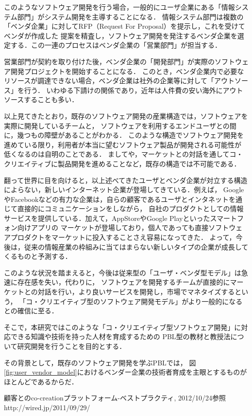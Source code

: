 \documentclass[11pt,a4paper,twoside]{jarticle}
\newcommand{\研究種別}{A}	%
\newcommand{\研究課題名}{コ・クリエイティブなソフトウェア開発のPBL型教育}
\newcommand{\研究機関名}{産業技術大学院大学}
\newcommand{\研究代表者氏名}{中鉢　欣秀}
\newcommand{\研究代表者氏名ふりがな}{ちゅうばち　よしひで}
\newcommand{\本応募effort}{\KLEffort{18}}	%
\newcommand{\研究期間の最終元号年度}{27}	%
\begin{document}
{    このようなソフトウェア開発を行う場合，一般的にユーザ企業にある「情報システム部門」がシステム開発を主導することになる．
    情報システム部門は複数の「ベンダ企業」に対してRFP（Request For Proposal）を提示し，これを受けてベンダが作成した
    提案を精査し，ソフトウェア開発を発注するベンダ企業を選定する．この一連のプロセスはベンダ企業の「営業部門」が担当する．
    
    営業部門が契約を取り付けた後，ベンダ企業の「開発部門」が実際のソフトウェア開発プロジェクトを開始することになる．
    このとき，ベンダ企業内で必要なリソースが調達できない場合，ベンダ企業は社外の企業等に対して「アウトソース」を行う．
    いわゆる下請けの関係であり，近年は人件費の安い海外にアウトソースすることも多い．
    
    以上見てきたとおり，既存のソフトウェア開発の産業構造では，ソフトウェアを実際に開発しているチームと，
    ソフトウェアを利用するエンドユーザとの間に，幾つもの障壁があることがわかる．
    このような構造でソフトウェア開発を進めている限り，利用者が本当に望むソフトウェア製品が開発される可能性が
    低くなるのは自明のことである．
    ましてや，マーケットとの対話を通してコ・クリエイティブに製品開発を進めることなど，既存の構造では不可能である．
    
    翻って世界に目を向けると，以上述べてきたユーザとベンダ企業が対立する構造によらない，新しいインターネット企業が登場してきている．例えば，
    GoogleやFacebookなどの有力な企業は，自らの顧客であるユーザとインタネットを通じて直接的にコミュニケーションをしながら，
    自社のプロダクトとしての情報サービスを提供している．加えて，AppStoreやGoogle Playといったスマートフォン向けアプリの
    マーケットが登場しており，個人であっても直接ソフトウェアプロダクトをマーケットに投入することさえ容易になってきた．
    よって，今後は，従来の情報産業の枠組みに当てはまらない新しいタイプの企業が成長してくるものと予測する．
    
    このような状況を踏まえると，今後は従来型の「ユーザ・ベンダ型モデル」は急速に存在感を失い，代わりに，
    ソフトウェアを開発するチームが直接的にマーケットとの対話を行い，より良いサービスを開発し，市場でマネタイズするという，
    「コ・クリエイティブ型のソフトウェア開発モデル」がより一般的になるとの確信に至る．
    
    そこで，本研究ではこのような「コ・クリエイティブ型ソフトウェア開発」に対応できる知識や技術を持った人材を育成するための
    PBL型の教材と教授法について研究開発を行うことを目的とする．
    
    その背景として，既存のソフトウェア開発を学ぶPBLでは，
    図\ref{fig:user_vendor_model}におけるベンダー企業の技術者育成を主眼とするものがほとんどであるからだ．
    
	\vspace{1cm}
	\begin{thebibliography}{99}
		 顧客とのco-creationプラットフォーム-ベストプラクティ, 2012/10/24参照 \\
http://wired.jp/2011/09/29/%

	\end{thebibliography}
}
\end{document}
